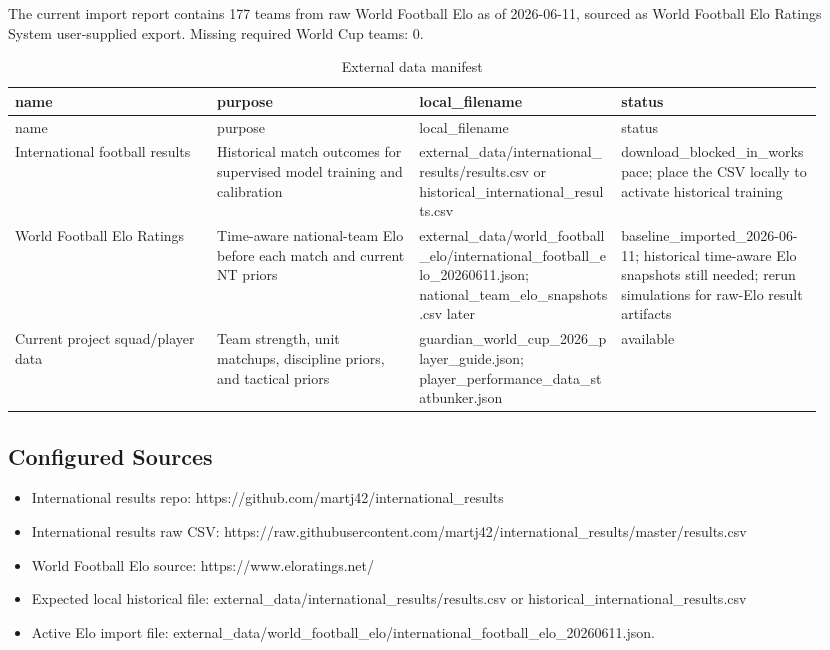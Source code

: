 \documentclass[10pt]{article}
\begin{document}
The current import report contains 177 teams from raw World Football Elo as of 2026-06-11, sourced as World Football Elo Ratings System user-supplied export. Missing required World Cup teams: 0.

\begin{longtable}{p{0.235\linewidth}p{0.235\linewidth}p{0.235\linewidth}p{0.235\linewidth}}
\caption{External data manifest}\\
\toprule
name & purpose & local\_filename & status \\
\midrule
\endfirsthead
\toprule
name & purpose & local\_filename & status \\
\midrule
\endhead
International football results & Historical match outcomes for supervised model training and calibration & external\_data/international\_results/results.csv or historical\_international\_results.csv & download\_blocked\_in\_workspace; place the CSV locally to activate historical training \\
World Football Elo Ratings & Time-aware national-team Elo before each match and current NT priors & external\_data/world\_football\_elo/international\_football\_elo\_20260611.json; national\_team\_elo\_snapshots.csv later & baseline\_imported\_2026-06-11; historical time-aware Elo snapshots still needed; rerun simulations for raw-Elo result artifacts \\
Current project squad/player data & Team strength, unit matchups, discipline priors, and tactical priors & guardian\_world\_cup\_2026\_player\_guide.json; player\_performance\_data\_statbunker.json & available \\
\bottomrule
\end{longtable}


\subsection{Configured Sources}

\begin{itemize}
  \item International results repo: https://github.com/martj42/international\_results
  \item International results raw CSV: https://raw.githubusercontent.com/martj42/international\_results/master/results.csv
  \item World Football Elo source: https://www.eloratings.net/
  \item Expected local historical file: external\_data/international\_results/results.csv or historical\_international\_results.csv
  \item Active Elo import file: external\_data/world\_football\_elo/international\_football\_elo\_20260611.json.
\end{itemize}
\end{document}
